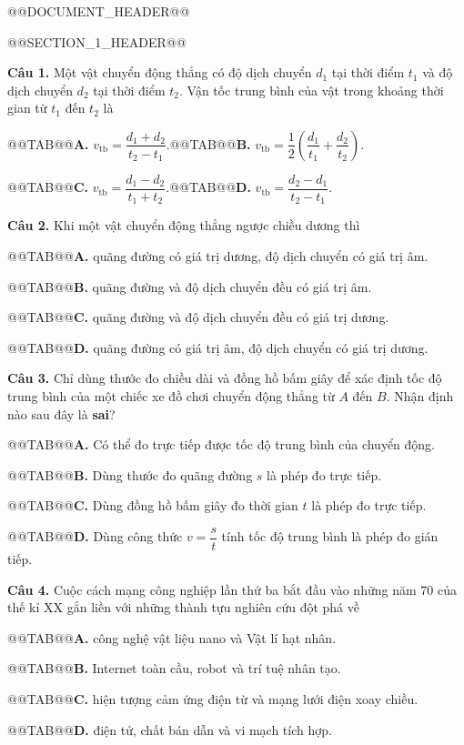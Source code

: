 \documentclass{article}
\begin{document}
@@DOCUMENT_HEADER@@

@@SECTION_1_HEADER@@

\textbf{Câu 1.} Một vật chuyển động thẳng có độ dịch chuyển $d_1$ tại thời điểm $t_1$ và độ dịch chuyển $d_2$ tại thời điểm $t_2$. Vận tốc trung bình của vật trong khoảng thời gian từ $t_1$ đến $t_2$ là

@@TAB@@\textbf{A.} $v_{\text{tb}} = \dfrac{d_1 + d_2}{t_2 - t_1}$.@@TAB@@\textbf{B.} $v_{\text{tb}} = \dfrac{1}{2}\left(\dfrac{d_1}{t_1} + \dfrac{d_2}{t_2}\right)$.

@@TAB@@\textbf{C.} $v_{\text{tb}} = \dfrac{d_1 - d_2}{t_1 + t_2}$.@@TAB@@\textbf{D.} $v_{\text{tb}} = \dfrac{d_2 - d_1}{t_2 - t_1}$.

\textbf{Câu 2.} Khi một vật chuyển động thẳng ngược chiều dương thì

@@TAB@@\textbf{A.} quãng đường có giá trị dương, độ dịch chuyển có giá trị âm.

@@TAB@@\textbf{B.} quãng đường và độ dịch chuyển đều có giá trị âm.

@@TAB@@\textbf{C.} quãng đường và độ dịch chuyển đều có giá trị dương.

@@TAB@@\textbf{D.} quãng đường có giá trị âm, độ dịch chuyển có giá trị dương.

\textbf{Câu 3.} Chỉ dùng thước đo chiều dài và đồng hồ bấm giây để xác định tốc độ trung bình của một chiếc xe đồ chơi chuyển động thẳng từ $A$ đến $B$. Nhận định nào sau đây là \textbf{sai}?

@@TAB@@\textbf{A.} Có thể đo trực tiếp được tốc độ trung bình của chuyển động.

@@TAB@@\textbf{B.} Dùng thước đo quãng đường $s$ là phép đo trực tiếp.

@@TAB@@\textbf{C.} Dùng đồng hồ bấm giây đo thời gian $t$ là phép đo trực tiếp.

@@TAB@@\textbf{D.} Dùng công thức $v = \dfrac{s}{t}$ tính tốc độ trung bình là phép đo gián tiếp.

\textbf{Câu 4.} Cuộc cách mạng công nghiệp lần thứ ba bắt đầu vào những năm 70 của thế kỉ XX gắn liền với những thành tựu nghiên cứu đột phá về

@@TAB@@\textbf{A.} công nghệ vật liệu nano và Vật lí hạt nhân.

@@TAB@@\textbf{B.} Internet toàn cầu, robot và trí tuệ nhân tạo.

@@TAB@@\textbf{C.} hiện tượng cảm ứng điện từ và mạng lưới điện xoay chiều.

@@TAB@@\textbf{D.} điện tử, chất bán dẫn và vi mạch tích hợp.
\end{document}
